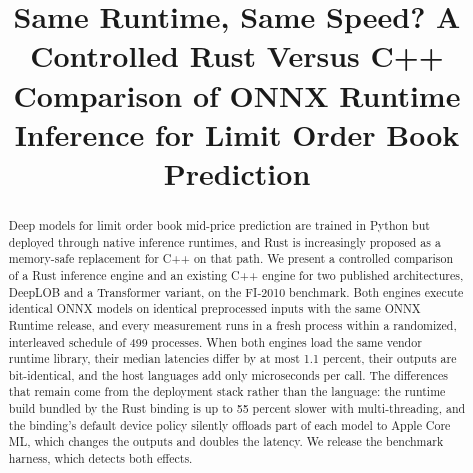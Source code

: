 \documentclass[conference]{IEEEtran}
\begin{document}
\title{Same Runtime, Same Speed? A Controlled Rust Versus C++ Comparison of ONNX Runtime Inference for Limit Order Book Prediction}

\author{
\and
{}
\and
{}
}

\maketitle

\begin{abstract}
Deep models for limit order book mid-price prediction are trained in Python but deployed through native inference runtimes, and Rust is increasingly proposed as a memory-safe replacement for C++ on that path. We present a controlled comparison of a Rust inference engine and an existing C++ engine for two published architectures, DeepLOB and a Transformer variant, on the FI-2010 benchmark. Both engines execute identical ONNX models on identical preprocessed inputs with the same ONNX Runtime release, and every measurement runs in a fresh process within a randomized, interleaved schedule of 499 processes. When both engines load the same vendor runtime library, their median latencies differ by at most 1.1 percent, their outputs are bit-identical, and the host languages add only microseconds per call. The differences that remain come from the deployment stack rather than the language: the runtime build bundled by the Rust binding is up to 55 percent slower with multi-threading, and the binding's default device policy silently offloads part of each model to Apple Core ML, which changes the outputs and doubles the latency. We release the benchmark harness, which detects both effects.
\end{abstract}
\end{document}
